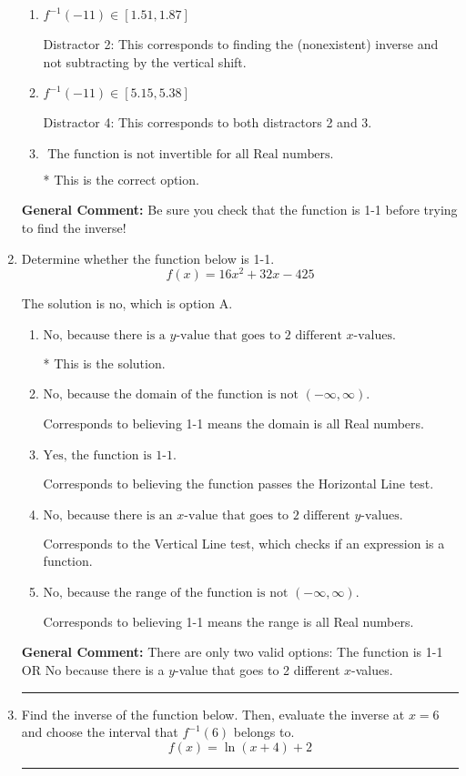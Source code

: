 \documentclass{extbook}[14pt]
\newcommand{\litem}[1]{\item #1

\rule{\textwidth}{0.4pt}}
\begin{document}
\begin{enumerate}
{\begin{enumerate}[label=\Alph*.]
 Distractor 3: This corresponds to finding the (nonexistent) inverse and dividing by a negative.
\item \( f^{-1}(-11) \in [1.51, 1.87] \)

 Distractor 2: This corresponds to finding the (nonexistent) inverse and not subtracting by the vertical shift.
\item \( f^{-1}(-11) \in [5.15, 5.38] \)

 Distractor 4: This corresponds to both distractors 2 and 3.
\item \( \text{ The function is not invertible for all Real numbers. } \)

* This is the correct option.
\end{enumerate}

\textbf{General Comment:} Be sure you check that the function is 1-1 before trying to find the inverse!
}
\litem{
Determine whether the function below is 1-1.
\[ f(x) = 16 x^2 + 32 x - 425 \]

The solution is \( \text{no} \), which is option A.\begin{enumerate}[label=\Alph*.]
\item \( \text{No, because there is a $y$-value that goes to 2 different $x$-values.} \)

* This is the solution.
\item \( \text{No, because the domain of the function is not $(-\infty, \infty)$.} \)

Corresponds to believing 1-1 means the domain is all Real numbers.
\item \( \text{Yes, the function is 1-1.} \)

Corresponds to believing the function passes the Horizontal Line test.
\item \( \text{No, because there is an $x$-value that goes to 2 different $y$-values.} \)

Corresponds to the Vertical Line test, which checks if an expression is a function.
\item \( \text{No, because the range of the function is not $(-\infty, \infty)$.} \)

Corresponds to believing 1-1 means the range is all Real numbers.
\end{enumerate}

\textbf{General Comment:} There are only two valid options: The function is 1-1 OR No because there is a $y$-value that goes to 2 different $x$-values.
}
\litem{
Find the inverse of the function below. Then, evaluate the inverse at $x = 6$ and choose the interval that $f^{-1}(6)$ belongs to.
\[ f(x) = \ln{(x+4)}+2 \]

}
\end{enumerate}
\end{document}
